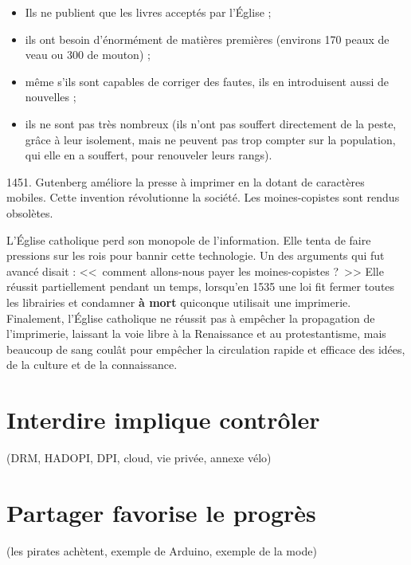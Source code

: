 \begin{itemize}
\item Ils ne publient que les livres acceptés par l'Église ;
\item ils ont besoin d'énormément de matières premières (environs 170 peaux de veau ou 300 de mouton) ;
\item même s'ils sont capables de corriger des fautes, ils en introduisent aussi de nouvelles ;
\item ils ne sont pas très nombreux (ils n'ont pas souffert directement de la peste, grâce à leur isolement, mais ne peuvent pas trop compter sur la population, qui elle en a souffert, pour renouveler leurs rangs).
\end{itemize}

1451.
Gutenberg améliore la presse à imprimer en la dotant de caractères mobiles.
Cette invention révolutionne la société.
Les moines-copistes sont rendus obsolètes.

L'Église catholique perd son monopole de l'information.
Elle tenta de faire pressions sur les rois pour bannir cette technologie.
Un des arguments qui fut avancé disait : <<~comment allons-nous payer les moines-copistes ?~>>
Elle réussit partiellement pendant un temps, lorsqu'en 1535 une loi fit fermer toutes les librairies et condamner \textbf{à mort} quiconque utilisait une imprimerie.
Finalement, l'Église catholique ne réussit pas à empêcher la propagation de l'imprimerie, laissant la voie libre à la Renaissance et au protestantisme, mais beaucoup de sang coulât pour empêcher la circulation rapide et efficace des idées, de la culture et de la connaissance.



\section{Interdire implique contrôler} %
(DRM, HADOPI, DPI, cloud, vie privée, annexe vélo)
\section{Partager favorise le progrès}
(les pirates achètent, exemple de Arduino, exemple de la mode)
